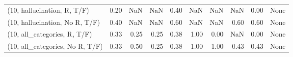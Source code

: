 \begin{table*}[h!]
\begin{adjustbox}{width=2\columnwidth,center}
\begin{tabular}{lrrr|rrr|rrr}
(10, hallucination, R, T/F)           &                      0.20 &                   NaN &                       NaN &                          0.40 &                       NaN &                           NaN &                                    NaN &                               0.00 &                                  None \\
(10, hallucination, No R, T/F)        &                      0.40 &                   NaN &                       NaN &                          0.60 &                       NaN &                           NaN &                                   0.60 &                               0.60 &                                  None \\
(10, all\_categories, R, T/F)          &                      0.33 &                  0.25 &                      0.25 &                          0.38 &                      1.00 &                          0.00 &                                    NaN &                               0.00 &                                  None \\
(10, all\_categories, No R, T/F)       &                      0.33 &                  0.50 &                      0.25 &                          0.38 &                      1.00 &                          1.00 &                                   0.43 &                               0.43 &                                  None \\




\end{tabular}
\end{adjustbox}
\end{table*}

